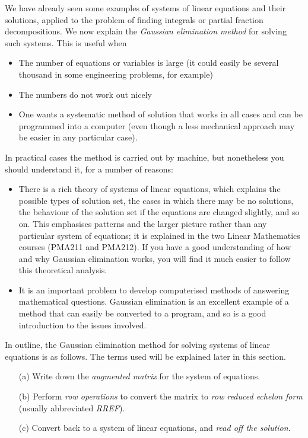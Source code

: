 \documentclass[a4paper]{book}
\newcommand{\PURPLE}[1]{{\color{purple}#1}}
\renewcommand{\:}{\colon}
\newcommand{\PMA}[1]{PMA#1}
\newcommand{\DEFN}[1]{\PURPLE{\emph{#1}}}
\theoremstyle{definition}
\begin{document}
We have already seen some examples of systems of linear equations and
their solutions, applied to the problem of finding integrals or
partial fraction decompositions.  We now explain the \DEFN{Gaussian
elimination method} for solving such systems.  This is useful when
\begin{itemize}
 \item The number of equations or variables is large (it could easily
  be several thousand in some engineering problems, for example)
 \item The numbers do not work out nicely
 \item One wants a systematic method of solution that works in all
  cases and can be programmed into a computer (even though a less
  mechanical approach may be easier in any particular case).
\end{itemize}
In practical cases the method is carried out by machine, but
nonetheless you should understand it, for a number of reasons:
\begin{itemize}
 \item There is a rich theory of systems of linear equations, which
  explains the possible types of solution set, the cases in which there
  may be no solutions, the behaviour of the solution set if the
  equations are changed slightly, and so on.  This emphasises patterns
  and the larger picture rather than any particular system of
  equations; it is explained in the two Linear Mathematics courses
  (\PMA{211} and \PMA{212}).  If you have a good understanding of how
  and why Gaussian elimination works, you will find it much easier to
  follow this theoretical analysis.
 \item It is an important problem to develop computerised methods of
  answering mathematical questions.  Gaussian elimination is an
  excellent example of a method that can easily be converted to a
  program, and so is a good introduction to the issues involved.
\end{itemize}

In outline, the Gaussian elimination method for solving systems of
linear equations is as follows.  The terms used will be explained
later in this section.
\begin{itemize}
 \item[(a)] Write down the \DEFN{augmented matrix} for the system of
  equations.
 \item[(b)] Perform \DEFN{row operations} to convert the matrix to
  \DEFN{row reduced echelon form} (usually abbreviated \DEFN{RREF}).
 \item[(c)] Convert back to a system of linear equations, and 
  \DEFN{read off the solution}. 
\end{itemize}
\end{document}
